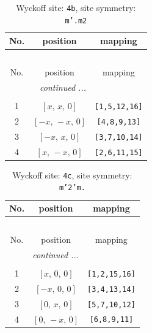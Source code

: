 \documentclass[fleqn,8pt]{jsarticle}
\begin{document}
\begin{longtable}{ccc}
\caption{Wyckoff site: {\tt 4b}, site symmetry: {\tt m'.m2}}
 \\
 \hline \hline
No. & position & mapping \\ \hline \endfirsthead

\multicolumn{2}{l}{\tablename\ \thetable{}} \\
 \hline \hline
No. & position & mapping \\ \hline \endhead

 \hline \hline
\multicolumn{2}{r}{\footnotesize\it continued ...} \\ \endfoot

 \hline \hline
\multicolumn{2}{r}{} \\ \endlastfoot

1 & $\left[ x,\, x,\, 0 \right]$ & {\tt [1,5,12,16]} \\ \hline
2 & $\left[ - x,\, - x,\, 0 \right]$ & {\tt [4,8,9,13]} \\ \hline
3 & $\left[ - x,\, x,\, 0 \right]$ & {\tt [3,7,10,14]} \\ \hline
4 & $\left[ x,\, - x,\, 0 \right]$ & {\tt [2,6,11,15]} \\
\end{longtable}
\renewcommand{\arraystretch}{1.2}
\begin{longtable}{ccc}
\caption{Wyckoff site: {\tt 4c}, site symmetry: {\tt m'2'm.}}
 \\
 \hline \hline
No. & position & mapping \\ \hline \endfirsthead

\multicolumn{2}{l}{\tablename\ \thetable{}} \\
 \hline \hline
No. & position & mapping \\ \hline \endhead

 \hline \hline
\multicolumn{2}{r}{\footnotesize\it continued ...} \\ \endfoot

 \hline \hline
\multicolumn{2}{r}{} \\ \endlastfoot

1 & $\left[ x,\, 0,\, 0 \right]$ & {\tt [1,2,15,16]} \\ \hline
2 & $\left[ - x,\, 0,\, 0 \right]$ & {\tt [3,4,13,14]} \\ \hline
3 & $\left[ 0,\, x,\, 0 \right]$ & {\tt [5,7,10,12]} \\ \hline
4 & $\left[ 0,\, - x,\, 0 \right]$ & {\tt [6,8,9,11]} \\
\end{longtable}
\end{document}
